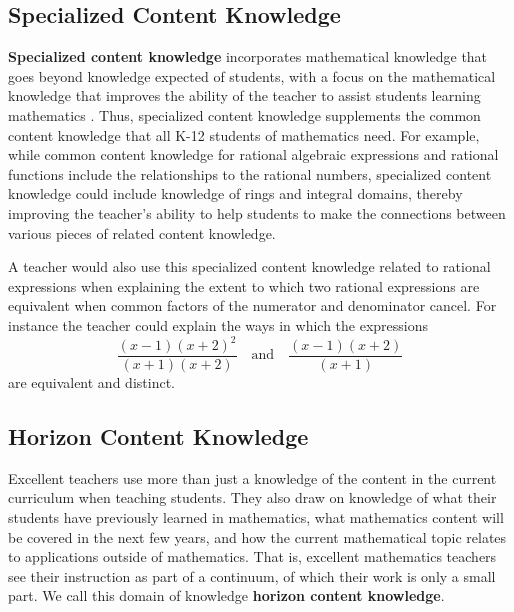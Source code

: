 \documentclass[
]{book}
\theoremstyle{definition}
\theoremstyle{definition}
\theoremstyle{definition}
\theoremstyle{remark}
\begin{document}
\hypertarget{specialized-content-knowledge}{%
\subsection{Specialized Content Knowledge}\label{specialized-content-knowledge}}

\textbf{Specialized content knowledge} incorporates mathematical knowledge that goes beyond knowledge expected of students, with a focus on the mathematical knowledge that improves the ability of the teacher to assist students learning mathematics \citep[p.~400]{Ball2008}. Thus, specialized content knowledge supplements the common content knowledge that all K-12 students of mathematics need. For example, while common content knowledge for rational algebraic expressions and rational functions include the relationships to the rational numbers, specialized content knowledge could include knowledge of rings and integral domains, thereby improving the teacher's ability to help students to make the connections between various pieces of related content knowledge.

A teacher would also use this specialized content knowledge related to rational expressions when explaining the extent to which two rational expressions are equivalent when common factors of the numerator and denominator cancel. For instance the teacher could explain the ways in which the expressions
\[ \frac{(x-1)(x+2)^2}{(x+1)(x+2)} \quad \mbox{and} \quad \frac{(x-1)(x+2)}{(x+1)}\] are equivalent and distinct.

\hypertarget{horizon-content-knowledge}{%
\subsection{Horizon Content Knowledge}\label{horizon-content-knowledge}}

Excellent teachers use more than just a knowledge of the content in the current curriculum when teaching students. They also draw on knowledge of what their students have previously learned in mathematics, what mathematics content will be covered in the next few years, and how the current mathematical topic relates to applications outside of mathematics. That is, excellent mathematics teachers see their instruction as part of a continuum, of which their work is only a small part. We call this domain of knowledge \textbf{horizon content knowledge}.
\end{document}
